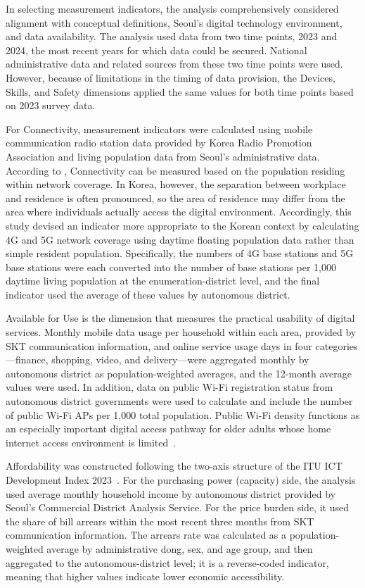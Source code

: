 In selecting measurement indicators, the analysis comprehensively considered alignment with conceptual definitions, Seoul's digital technology environment, and data availability. The analysis used data from two time points, 2023 and 2024, the most recent years for which data could be secured. National administrative data and related sources from these two time points were used. However, because of limitations in the timing of data provision, the Devices, Skills, and Safety dimensions applied the same values for both time points based on 2023 survey data.

For Connectivity, measurement indicators were calculated using mobile communication radio station data provided by Korea Radio Promotion Association and living population data from Seoul's administrative data. According to \citet{ITU2023}, Connectivity can be measured based on the population residing within network coverage. In Korea, however, the separation between workplace and residence is often pronounced, so the area of residence may differ from the area where individuals actually access the digital environment. Accordingly, this study devised an indicator more appropriate to the Korean context by calculating 4G and 5G network coverage using daytime floating population data rather than simple resident population. Specifically, the numbers of 4G base stations and 5G base stations were each converted into the number of base stations per 1{,}000 daytime living population at the enumeration-district level, and the final indicator used the average of these values by autonomous district.

Available for Use is the dimension that measures the practical usability of digital services. Monthly mobile data usage per household within each area, provided by SKT communication information, and online service usage days in four categories---finance, shopping, video, and delivery---were aggregated monthly by autonomous district as population-weighted averages, and the 12-month average values were used. In addition, data on public Wi-Fi registration status from autonomous district governments were used to calculate and include the number of public Wi-Fi APs per 1{,}000 total population. Public Wi-Fi density functions as an especially important digital access pathway for older adults whose home internet access environment is limited~\citep{vanDijk2020}.

Affordability was constructed following the two-axis structure of the ITU ICT Development Index 2023~\citep{ITU2024}. For the purchasing power (capacity) side, the analysis used average monthly household income by autonomous district provided by Seoul's Commercial District Analysis Service. For the price burden side, it used the share of bill arrears within the most recent three months from SKT communication information. The arrears rate was calculated as a population-weighted average by administrative dong, sex, and age group, and then aggregated to the autonomous-district level; it is a reverse-coded indicator, meaning that higher values indicate lower economic accessibility.

